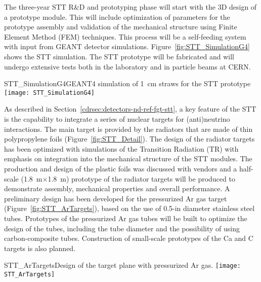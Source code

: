The three-year STT R\&D and prototyping phase will start with the 3D
design of a prototype module.  This will include optimization of
parameters for the prototype assembly and validation of the mechanical
structure using Finite Element Method (FEM) techniques. This process
will be a self-feeding system with input from GEANT detector
simulations.  Figure~\ref{fig:STT_SimulationG4} shows the STT
simulation.  
The STT prototype will be fabricated and will undergo
extensive tests both in the laboratory and 
in particle beams at CERN.
\begin{cdrfigure}
{STT_SimulationG4}{GEANT4 simulation of 1~cm straws for the STT prototype}
\texttt{[image: STT\_SimulationG4]}
\end{cdrfigure}



As described in Section~\ref{cdrsec:detectors-nd-ref-fgt-stt}, a key
feature of the STT is the capability to integrate a series of
nuclear targets for (anti)neutrino interactions.  The main
target is provided by the radiators that are made of thin polypropylene foils
(Figure~\ref{fig:STT_Detail}).  The design of the radiator targets has
been optimized with simulations of the Transition Radiation (TR)
with emphasis on integration into the mechanical structure of
the STT modules.  The production and design of the plastic foils was
discussed with vendors and a half-scale
(1.8~m$\times$1.8~m) prototype of the radiator targets will be produced to demonstrate
assembly, mechanical properties and overall
performance.
A preliminary design has been developed for the
pressurized Ar gas target (Figure~\ref{fig:STT_ArTargets}), based on
the use of 0.5-in diameter stainless steel tubes.
Prototypes of the pressurized Ar gas tubes will be built to 
optimize the design of the tubes, including the tube diameter
and the possibility of using carbon-composite tubes. 
Construction of small-scale prototypes of the Ca and C targets is also planned.
\begin{cdrfigure}
{STT_ArTargets}{Design of the target plane with pressurized Ar gas.}
\texttt{[image: STT\_ArTargets]}
\end{cdrfigure}


